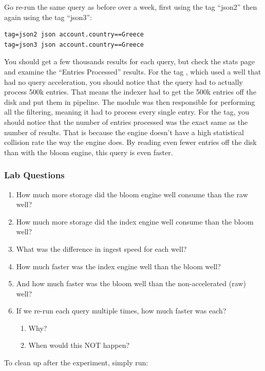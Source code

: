 Go re-run the same query as before over a week, first using the tag
``json2'' then again using the tag ``json3'':

\begin{Verbatim}[breaklines=true]
tag=json2 json account.country==Greece
tag=json3 json account.country==Greece
\end{Verbatim}

You should get a few thousands results for each query,  but check the stats page and examine the
``Entries Processed'' results. For the tag , which used a well
that had no query acceleration, you should notice that the query had to
actually process 500k entries. That means the indexer had to get the
500k entries off the disk and put them in pipeline. The  module
was then responsible for performing all the filtering, meaning it had to
process every single entry. For the  tag, you should notice
that the number of entries processed was the exact same as the number of
results. That is because the  engine doesn't have a high
statistical collision rate the way the  engine does. By reading
even fewer entries off the disk than with the bloom engine, this query is even faster.

\subsubsection{Lab Questions}

\begin{enumerate}
\item How much more storage did the bloom engine well consume than the raw well?
\item How much more storage did the index engine well consume than the bloom well?
\item What was the difference in ingest speed for each well?
\item How much faster was the index engine well than the bloom well?
\item And how much faster was the bloom well than the non-accelerated (raw) well?
\item If we re-run each query multiple times, how much faster was each?
	\begin{enumerate}
	\item Why?
	\item When would this NOT happen?
	\end{enumerate}
\end{enumerate}

To clean up after the experiment, simply run:

